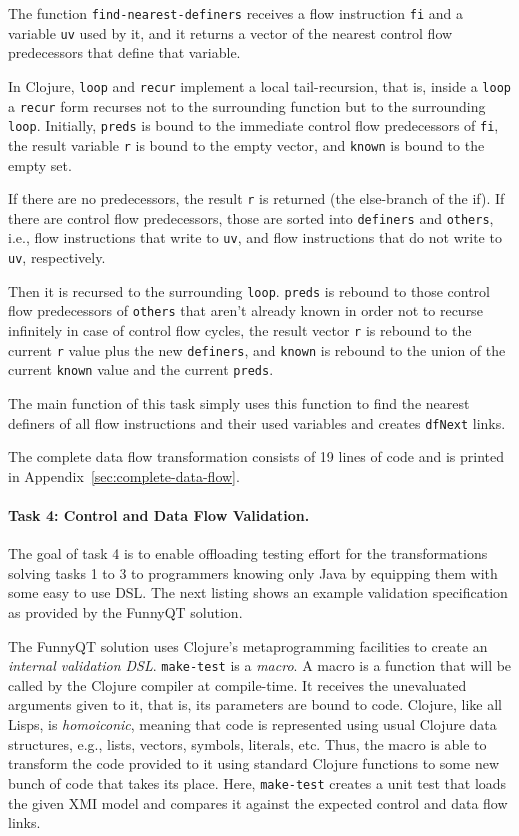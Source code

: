 \documentclass[submission]{eptcs}
\begin{document}
The function \verb|find-nearest-definers| receives a flow instruction \verb|fi|
and a variable \verb|uv| used by it, and it returns a vector of the nearest
control flow predecessors that define that variable.



In Clojure, \verb|loop| and \verb|recur| implement a local tail-recursion, that
is, inside a \verb|loop| a \verb|recur| form recurses not to the surrounding
function but to the surrounding \verb|loop|.  Initially, \verb|preds| is bound
to the immediate control flow predecessors of \verb|fi|, the result variable
\verb|r| is bound to the empty vector, and \verb|known| is bound to the empty
set.

If there are no predecessors, the result \verb|r| is returned (the else-branch
of the if).  If there are control flow predecessors, those are sorted into
\verb|definers| and \verb|others|, i.e., flow instructions that write to
\verb|uv|, and flow instructions that do not write to \verb|uv|, respectively.

Then it is recursed to the surrounding \verb|loop|.  \verb|preds| is rebound to
those control flow predecessors of \verb|others| that aren't already known in
order not to recurse infinitely in case of control flow cycles, the result
vector \verb|r| is rebound to the current \verb|r| value plus the new
\verb|definers|, and \verb|known| is rebound to the union of the current
\verb|known| value and the current \verb|preds|.

The main function of this task simply uses this function to find the nearest
definers of all flow instructions and their used variables and creates
\verb|dfNext| links.

The complete data flow transformation consists of 19 lines of code and is
printed in Appendix~\ref{sec:complete-data-flow}.


\paragraph{Task 4: Control and Data Flow Validation.}
\label{sec:task-4}

The goal of task 4 is to enable offloading testing effort for the
transformations solving tasks 1 to 3 to programmers knowing only Java by
equipping them with some easy to use DSL.  The next listing shows an example
validation specification as provided by the FunnyQT solution.



The FunnyQT solution uses Clojure's metaprogramming facilities to create an
\emph{internal validation DSL}.  \verb|make-test| is a \emph{macro}.  A macro
is a function that will be called by the Clojure compiler at compile-time.  It
receives the unevaluated arguments given to it, that is, its parameters are
bound to code.  Clojure, like all Lisps, is \emph{homoiconic}, meaning that
code is represented using usual Clojure data structures, e.g., lists, vectors,
symbols, literals, etc.  Thus, the macro is able to transform the code provided
to it using standard Clojure functions to some new bunch of code that takes its
place.  Here, \verb|make-test| creates a unit test that loads the given XMI
model and compares it against the expected control and data flow links.
\end{document}
